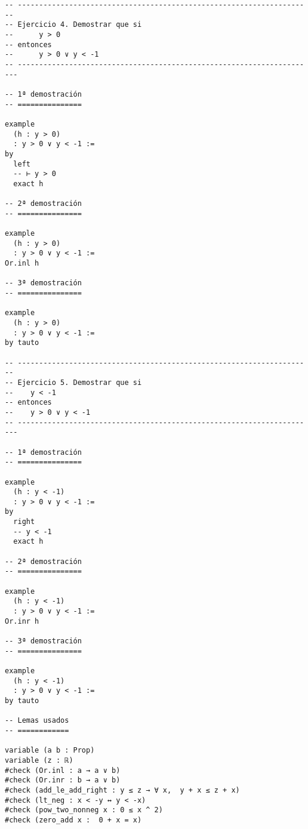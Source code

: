 \begin{verbatim}
-- ---------------------------------------------------------------------
-- Ejercicio 4. Demostrar que si
--      y > 0
-- entonces
--      y > 0 ∨ y < -1
-- ----------------------------------------------------------------------

-- 1ª demostración
-- ===============

example
  (h : y > 0)
  : y > 0 ∨ y < -1 :=
by
  left
  -- ⊢ y > 0
  exact h

-- 2ª demostración
-- ===============

example
  (h : y > 0)
  : y > 0 ∨ y < -1 :=
Or.inl h

-- 3ª demostración
-- ===============

example
  (h : y > 0)
  : y > 0 ∨ y < -1 :=
by tauto

-- ---------------------------------------------------------------------
-- Ejercicio 5. Demostrar que si
--    y < -1
-- entonces
--    y > 0 ∨ y < -1
-- ----------------------------------------------------------------------

-- 1ª demostración
-- ===============

example
  (h : y < -1)
  : y > 0 ∨ y < -1 :=
by
  right
  -- y < -1
  exact h

-- 2ª demostración
-- ===============

example
  (h : y < -1)
  : y > 0 ∨ y < -1 :=
Or.inr h

-- 3ª demostración
-- ===============

example
  (h : y < -1)
  : y > 0 ∨ y < -1 :=
by tauto

-- Lemas usados
-- ============

variable (a b : Prop)
variable (z : ℝ)
#check (Or.inl : a → a ∨ b)
#check (Or.inr : b → a ∨ b)
#check (add_le_add_right : y ≤ z → ∀ x,  y + x ≤ z + x)
#check (lt_neg : x < -y ↔ y < -x)
#check (pow_two_nonneg x : 0 ≤ x ^ 2)
#check (zero_add x :  0 + x = x)
\end{verbatim}

